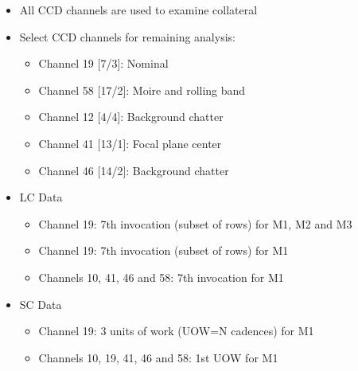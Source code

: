 \begin{itemize}

\item All CCD channels are used to examine collateral
\item Select CCD channels for remaining analysis:

  \begin{itemize}
    \item Channel 19 [7/3]: Nominal
    \item Channel 58 [17/2]: Moire and rolling band
    \item Channel 12 [4/4]: Background chatter
    \item Channel 41 [13/1]: Focal plane center
    \item Channel 46 [14/2]: Background chatter
  \end{itemize}

\item LC Data

  \begin{itemize}
    \item Channel 19: 7th invocation (subset of rows) for M1, M2 and M3
    \item Channel 19: 7th invocation (subset of rows) for M1
    \item Channels 10, 41, 46 and 58: 7th invocation for M1 
  \end{itemize}

\item SC Data

  \begin{itemize}
    \item Channel 19: 3 units of work (UOW=N cadences) for M1
    \item Channels 10, 19, 41, 46 and 58: 1st UOW for M1
  \end{itemize}

\end{itemize}
